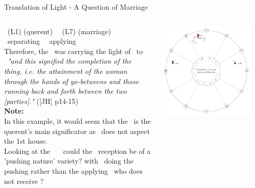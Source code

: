 \begin{frame}[t]{Translation of Light  - A Question of Marriage}
\begin{columns}[T, onlytextwidth]
\Mercury\ (L1) (querent) \Quincunx\ \Jupiter\ (L7) (marriage) \\
\Moon\ separating \Sextile\ \Mercury\ applying \Square\ \Jupiter \\
\vspace{0.25cm}
Therefore, the \Moon\ was carrying the light of \Mercury\ to \Jupiter\ \textsl{"and this signified the completion of the thing, i.e. the attainment of the woman through the hands of go-betweens and those running back and forth between the two [parties]."} ([JH] p14-15) \\
\vspace{0.15cm}
\textbf{Note:} \\
\small
In this example, it would seem that the \Moon\ is  the querent's main significator as \Mercury\ does not aspect the 1st house. \\

Looking at the \Moon\ \Sextile\ \Mercury\, could the \Mercury\ reception be of a 'pushing nature' variety? with \Mercury\ doing the pushing rather than the applying \Moon\, who does not receive \Mercury?\footnotemark[1]

\begin{center}
{\includegraphics[width=0.9\textwidth]{charts/60-translation}} \\
\end{center}
\end{columns}
\end{frame}
